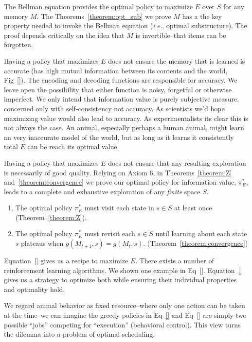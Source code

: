 \documentclass[9pt,twocolumn,twoside]{pnas-new}
\begin{document}
The Bellman equation provides the optimal policy to maximize $E$ over $S$ for any memory $M$. The Theorems~\ref{theorem:opt_sub} we prove $M$ has a the key property needed to invoke the Bellman equation (\textit{i.e.}, optimal substructure). The proof depends critically on the idea that $M$ is invertible--that items can be forgotten. 


Having a policy that maximizes $E$ does not ensure the memory that is learned is accurate (has high mutual information between its contents and the world, Fig~\ref{}). The encoding and decoding functions are responsible for accuracy. We leave open the possibility that either function is noisy, forgetful or otherwise imperfect. We only intend that information value is purely subjective measure, concerned only with self-consistency not accuracy. As scientists we'd hope maximizing value would also lead to accuracy. As experimentalists its clear this is not always the case. An animal, especially perhaps a human animal, might learn an very inaccurate model of the world, but as long as it learns it consistently total $E$ can be reach its optimal value.

Having a policy that maximizes $E$ does not ensure that any resulting exploration is necessarily of good quality. Relying on Axiom 6, in Theorems~\ref{theorem:Z} and~\ref{theorem:convergence} we prove our optimal policy for information value, $\pi^*_E$, leads to a complete and exhaustive exploration of any \textit{finite} space $S$.

\begin{enumerate}[noitemsep,wide=0pt,leftmargin=\dimexpr\labelwidth+2\labelsep\relax]
    \item The optimal policy $\pi^*_E$ must visit each state in $s \in S$ at least once (Theorem~\ref{theorem:Z}).
    \item The optimal policy $\pi^*_E$ must revisit each $s \in S$ until learning about each state $s$ plateaus when $g(M_{t+1}, s) = g(M_{t},s)$. (Theorem~\ref{theorem:convergence})
\end{enumerate}

Equation~\ref{} gives us a recipe to maximize $E$. There exists a number of reinforcement learning algorithms. We shown one example in Eq~\ref{}. Equation~\ref{} gives us a strategy to optimize both while ensuring their individual properties and optimality hold. 

We regard animal behavior as fixed resource--where only one action can be taken at the time--we can imagine the greedy policies in Eq~\ref{} and Eq~\ref{} are simply two possible ``jobs'' competing for ``execution'' (behavioral control). This view turns the dilemma into a problem of optimal scheduling. 
\end{document}
